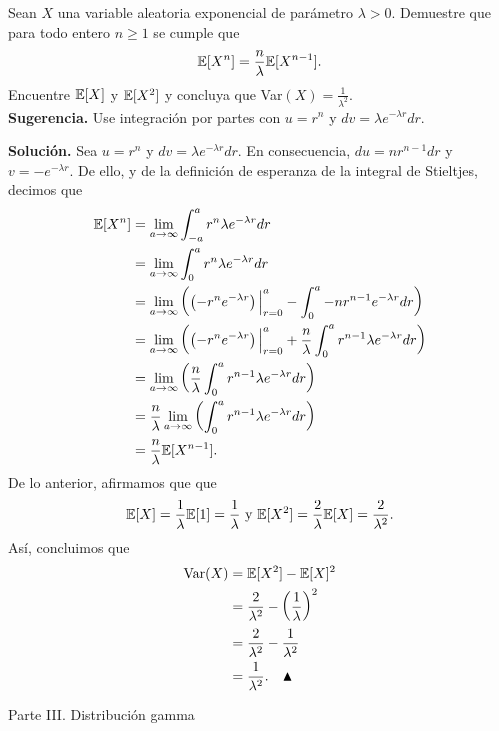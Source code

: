 \documentclass[11pt]{scrartcl}
\begin{document}
\begin{mdframed}[style=mdpurplebox, frametitle={Ejercicio 03, Tarea 11, Probabilidad y Estadística I}]
    Sean $X$ una variable aleatoria exponencial de parámetro $\lambda > 0$. Demuestre que para todo entero $n \geq 1$
    se cumple que
    \begin{equation*}
        \mathbb E[X^n]=\frac{n}{\lambda}\mathbb E[X^{n-1}].
    \end{equation*}
    Encuentre $\mathbb E[X]$ y $\mathbb E[X^2]$ y concluya que Var$(X)=\frac{1}{\lambda^2}$. \\
    \textbf{Sugerencia.} Use integración por partes con $u=r^n$ y $dv=\lambda e^{-\lambda r}dr$.
\end{mdframed}
\textbf{Solución.}
Sea $u=r^n$ y $dv=\lambda e^{-\lambda r}dr$. En consecuencia, $du=nr^{n-1}dr$ y $v=-e^{-\lambda r}$. De ello, y de la definición
de esperanza de la integral de Stieltjes, decimos que
\begin{align*}
    \mathbb E[X^n] &= \lim_{a\to \infty}\int_{-a}^{a}r^n\lambda e^{-\lambda r}dr \\
    &= \lim_{a\to \infty}\int_{0}^{a}r^n\lambda e^{-\lambda r}dr \\
    &= \lim_{a\to \infty}\left(\left(-r^ne^{-\lambda r}\right)\Big|_{r=0}^a-\int_{0}^{a}-nr^{n-1}e^{-\lambda r}dr\right) \\
    &= \lim_{a\to \infty}\left(\left(-r^ne^{-\lambda r}\right)\Big|_{r=0}^a+\frac{n}{\lambda}\int_{0}^{a}r^{n-1}\lambda e^{-\lambda r}dr\right) \\
    &= \lim_{a\to \infty}\left(\frac{n}{\lambda}\int_{0}^{a}r^{n-1}\lambda e^{-\lambda r}dr\right) \\
    &= \frac{n}{\lambda}\lim_{a\to \infty}\left(\int_{0}^{a}r^{n-1}\lambda e^{-\lambda r}dr\right) \\
    &= \frac{n}{\lambda}\mathbb E[X^{n-1}].
\end{align*}
De lo anterior, afirmamos que que
\begin{equation*}
    \mathbb E[X]=\frac{1}{\lambda}\mathbb E[1]=\frac{1}{\lambda} \text{ y } \mathbb E[X^2]=\frac{2}{\lambda}\mathbb E[X]=\frac{2}{\lambda^2}.
\end{equation*}
Así, concluimos que
\begin{align*}
    \text{Var}(X) &= \mathbb E[X^2]-\mathbb E[X]^2 \\
    &= \frac{2}{\lambda^2}-\left(\frac{1}{\lambda}\right)^2 \\
    &= \frac{2}{\lambda^2}-\frac{1}{\lambda^2} \\
    &= \frac{1}{\lambda^2}. \quad \blacktriangle
\end{align*}
\begin{center}
    Parte III. Distribución gamma
\end{center}
\end{document}
